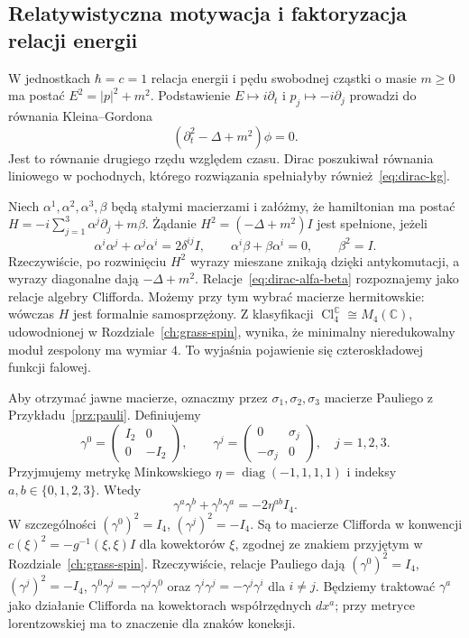\subsection{Relatywistyczna motywacja i faktoryzacja relacji energii}

W jednostkach $\hbar=c=1$ relacja energii i pędu
swobodnej cząstki o masie $m\geq0$ ma postać
$E^2=|p|^2+m^2$. Podstawienie $E\mapsto i\partial_t$
i $p_j\mapsto-i\partial_j$ prowadzi do równania
Kleina--Gordona
\begin{equation}\label{eq:dirac-kg}
 (\partial_t^2-\Delta+m^2)\phi=0.
\end{equation}
Jest to równanie drugiego rzędu względem czasu.
Dirac poszukiwał równania liniowego w pochodnych,
którego rozwiązania spełniałyby również~\eqref{eq:dirac-kg}.

Niech $\alpha^1,\alpha^2,\alpha^3,\beta$ będą stałymi
macierzami i załóżmy, że hamiltonian ma postać
$H=-i\sum_{j=1}^3\alpha^j\partial_j+m\beta$.
Żądanie $H^2=(-\Delta+m^2)I$ jest spełnione, jeżeli
\begin{equation}\label{eq:dirac-alfa-beta}
 \alpha^i\alpha^j+\alpha^j\alpha^i=2\delta^{ij}I,
 \qquad \alpha^i\beta+\beta\alpha^i=0,
 \qquad \beta^2=I.
\end{equation}
Rzeczywiście, po rozwinięciu $H^2$ wyrazy mieszane
znikają dzięki antykomutacji, a wyrazy diagonalne dają
$-\Delta+m^2$. Relacje~\eqref{eq:dirac-alfa-beta}
rozpoznajemy jako relacje algebry Clifforda.
Możemy przy tym wybrać macierze hermitowskie: wówczas $H$
jest formalnie samosprzężony. Z klasyfikacji
$\operatorname{Cl}^{\mathbb C}_4\cong M_4(\mathbb C)$,
udowodnionej w Rozdziale~\ref{ch:grass-spin}, wynika,
że minimalny nieredukowalny moduł zespolony ma wymiar $4$.
To wyjaśnia pojawienie się czteroskładowej funkcji falowej.

Aby otrzymać jawne macierze, oznaczmy przez
$\sigma_1,\sigma_2,\sigma_3$ macierze Pauliego z
Przykładu~\ref{prz:pauli}. Definiujemy
\begin{equation}\label{eq:dirac-gamma-reprezentacja}
 \gamma^0=\begin{pmatrix}I_2&0\\0&-I_2\end{pmatrix},
 \qquad
 \gamma^j=\begin{pmatrix}0&\sigma_j\\-\sigma_j&0\end{pmatrix},
 \quad j=1,2,3.
\end{equation}
Przyjmujemy metrykę Minkowskiego
$\eta=\operatorname{diag}(-1,1,1,1)$ i indeksy
$a,b\in\{0,1,2,3\}$. Wtedy
\begin{equation}\label{eq:dirac-antykomutacja}
 \gamma^a\gamma^b+\gamma^b\gamma^a=-2\eta^{ab}I_4.
\end{equation}
W szczególności $(\gamma^0)^2=I_4$,
$(\gamma^j)^2=-I_4$. Są to macierze Clifforda w konwencji
$c(\xi)^2=-g^{-1}(\xi,\xi)I$ dla kowektorów $\xi$,
zgodnej ze znakiem przyjętym w Rozdziale~\ref{ch:grass-spin}.
Rzeczywiście, relacje Pauliego dają
$(\gamma^0)^2=I_4$, $(\gamma^j)^2=-I_4$,
$\gamma^0\gamma^j=-\gamma^j\gamma^0$ oraz
$\gamma^i\gamma^j=-\gamma^j\gamma^i$ dla $i\ne j$.
Będziemy traktować $\gamma^a$ jako działanie Clifforda
na kowektorach współrzędnych $dx^a$; przy metryce
lorentzowskiej ma to znaczenie dla znaków koneksji.

